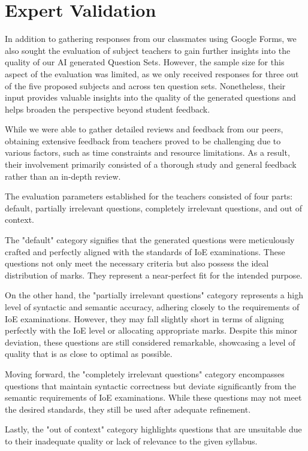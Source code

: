 \documentclass[12pt]{report}
\begin{document}
\section{Expert Validation}
In addition to gathering responses from our classmates using Google Forms, we also sought the evaluation of subject teachers to gain further insights into the quality of our AI generated Question Sets. However, the sample size for this aspect of the evaluation was limited, as we only received responses for three out of the five proposed subjects and across ten question sets. Nonetheless, their input provides valuable insights into the quality of the generated questions and helps broaden the perspective beyond student feedback.

While we were able to gather detailed reviews and feedback from our peers, obtaining extensive feedback from teachers proved to be challenging due to various factors, such as time constraints and resource limitations. As a result, their involvement primarily consisted of a thorough study and general feedback rather than an in-depth review. 

The evaluation parameters established for the teachers consisted of four parts: default, partially irrelevant questions, completely irrelevant questions, and out of context. 

The "default" category signifies that the generated questions were meticulously crafted and perfectly aligned with the standards of IoE examinations. These questions not only meet the necessary criteria but also possess the ideal distribution of marks. They represent a  near-perfect fit for the intended purpose.

On the other hand, the "partially irrelevant questions" category represents  a high level of syntactic and semantic accuracy, adhering closely to the requirements of IoE examinations. However, they may fall slightly short in terms of aligning perfectly with the IoE level or allocating appropriate marks. Despite this minor deviation, these questions are still considered remarkable, showcasing a level of quality that is as close to optimal as possible.

Moving forward, the "completely irrelevant questions" category encompasses questions that maintain syntactic correctness but deviate significantly from the semantic requirements of IoE examinations. While these questions may not meet the desired standards, they still be used after adequate refinement.

Lastly, the "out of context" category highlights questions that are unsuitable due to their inadequate quality or lack of relevance to the given syllabus.
\end{document}
